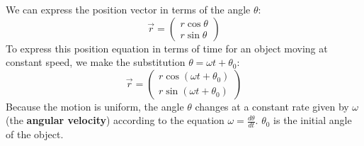 \documentclass[article, 11pt]{article}
\theoremstyle{definition}
\begin{document}
    \begin{figure}[H]
        \centering
    \end{figure}
    We can express the position vector in terms of the angle $\theta$:
    \begin{equation}
        \vec{r} = \begin{pmatrix} r\cos\theta \\ r\sin\theta \end{pmatrix}
    \end{equation}
    To express this position equation in terms of time for an object moving at constant speed, we make the substitution $\theta = \omega t + \theta_0$:
    \begin{equation}
        \vec{r} = \begin{pmatrix} r\cos(\omega t + \theta_0) \\ r\sin(\omega t + \theta_0) \end{pmatrix}
    \end{equation}
    Because the motion is uniform, the angle $\theta$ changes at a constant rate given by $\omega$ (the \textbf{angular velocity}) according to the equation $\omega = \frac{d\theta}{dt}$. $\theta_0$ is the initial angle of the object.
\end{document}
